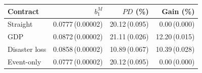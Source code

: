 \begin{tabular}{@{}lrrr@{}}
\toprule
Contract & $b_1^M$ & $PD$ (\%) & Gain (\%) \\ \midrule
Straight & 0.0777\,(0.00002) & 20.12\,(0.095) & 0.00\,(0.000) \\
GDP & 0.0872\,(0.00002) & 21.11\,(0.026) & 12.20\,(0.015) \\
Disaster loss & 0.0858\,(0.00002) & 10.89\,(0.067) & 10.39\,(0.028) \\
Event-only & 0.0777\,(0.00002) & 20.12\,(0.095) & 0.00\,(0.000) \\
\bottomrule
\end{tabular}
